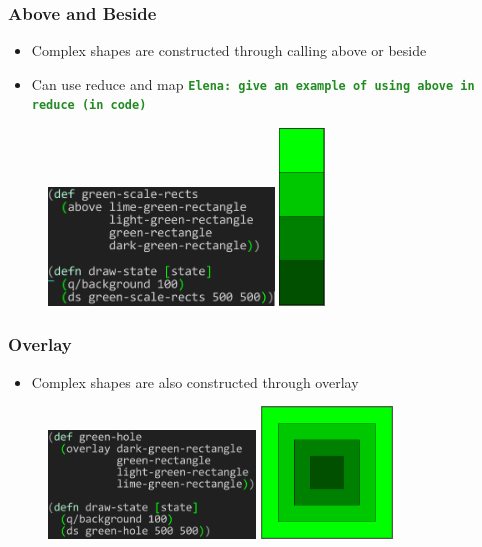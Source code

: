 \documentclass{beamer}
\newcommand{\comment}[1]{{\bf \tt  {#1}}}
\newcommand{\emcomment}[1]{\textcolor{ForestGreen}{\comment{Elena: {#1}}}}
\begin{document}
\begin{frame}
\frametitle{Above and Beside}
	\begin{itemize}
		\item Complex shapes are constructed through calling above or beside
		\item Can use reduce and map \emcomment{give an example of using {\tt above} in {\tt reduce} (in code)}
	\end{itemize}
	\begin{figure}
	\vspace{-1cm}
	\includegraphics[width=6cm]{PresentationImages/greenScaleRects.png}
	\hspace{1.5cm}
	\includegraphics[width=1.2cm]{PresentationImages/greenScaleTower.png}
	\end{figure}
\end{frame}

\begin{frame}
\frametitle{Overlay}
	\begin{itemize}
		\item Complex shapes are also constructed through overlay
	\end{itemize}
	\begin{figure}
	\includegraphics[width=5.5cm]{PresentationImages/fcsGreenHoleCode.png}
	\hspace{1cm}
	\includegraphics[width=3.5cm]{PresentationImages/greenHole.png}
	\end{figure}
\end{frame}
\end{document}
